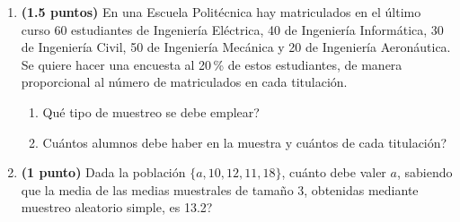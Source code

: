 
\begin{enumerate}[label=\alph*)]
  \item \textbf{(1.5 puntos)} En una Escuela Politécnica hay matriculados
  en el último curso 60 estudiantes de Ingeniería Eléctrica, 40 de Ingeniería
  Informática, 30 de Ingeniería Civil, 50 de Ingeniería Mecánica y 20 de
  Ingeniería Aeronáutica. Se quiere hacer una encuesta al 20\,\% de estos
  estudiantes, de manera proporcional al número de matriculados en cada
  titulación.
  \begin{enumerate}[label=\arabic*.]
    \item \textquestiondown{}Qué tipo de muestreo se debe emplear?
    \item \textquestiondown{}Cuántos alumnos debe haber en la muestra y
    cuántos de cada titulación?
  \end{enumerate}
  \item \textbf{(1 punto)} Dada la población $\{a,10,12,11,18\}$,
  \textquestiondown{}cuánto debe valer $a$, sabiendo que la media de las
  medias muestrales de tamaño 3, obtenidas mediante muestreo aleatorio
  simple, es 13.2?
\end{enumerate}
